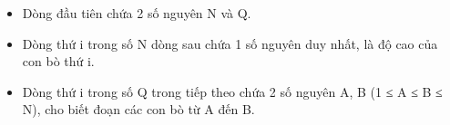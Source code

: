 \begin{itemize}
	\item     Dòng đầu tiên chứa 2 số nguyên N và Q.   
	\item     Dòng thứ i trong số N dòng sau chứa 1 số nguyên duy nhất, là độ cao của con bò thứ i.   
	\item     Dòng thứ i trong số Q trong tiếp theo chứa 2 số nguyên A, B (1 ≤ A ≤ B ≤ N), cho biết đoạn các con bò từ A đến B.   
\end{itemize}